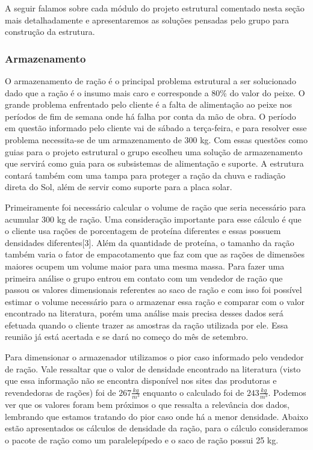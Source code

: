 A seguir falamos sobre cada módulo do projeto estrutural comentado nesta seção mais detalhadamente e apresentaremos as soluções pensadas pelo grupo para construção da estrutura.

\subsubsection{Armazenamento}

O armazenamento de ração é o principal problema estrutural a ser solucionado dado que a ração é o insumo mais caro e corresponde a 80\% do valor do peixe. O grande problema enfrentado pelo cliente é a falta de alimentação ao peixe nos períodos de fim de semana onde há falha por conta da mão de obra. O período em questão informado pelo cliente vai de sábado a terça-feira, e para resolver esse problema necessita-se de um armazenamento de 300 kg. Com essas questões como guias para o projeto estrutural o grupo escolheu uma solução de armazenamento que servirá como guia para os subsistemas de alimentação e suporte. A estrutura contará também com uma tampa para proteger a ração da chuva e radiação direta do Sol, além de servir como suporte para a placa solar.

Primeiramente foi necessário calcular o volume de ração que seria necessário para acumular 300 kg de ração. Uma consideração importante para esse cálculo é que o cliente usa rações de porcentagem de proteína diferentes e essas possuem densidades diferentes[3]. Além da quantidade de proteína, o tamanho da ração também varia o fator de empacotamento que faz com que as rações de dimensões maiores ocupem um volume maior para uma mesma massa. Para fazer uma primeira análise o grupo entrou em contato com um vendedor de ração que passou os valores dimensionais referentes ao saco de ração e com isso foi possível estimar o volume necessário para o armazenar essa ração e comparar com o valor encontrado na literatura, porém uma análise mais precisa desses dados será efetuada quando o cliente trazer as amostras da ração utilizada por ele. Essa reunião já está acertada e se dará no começo do mês de setembro.


Para dimensionar o armazenador utilizamos o pior caso informado pelo vendedor de ração. Vale ressaltar que o valor de densidade encontrado na literatura \cite{Omicsonline} (visto que essa informação não se encontra disponível nos sites das produtoras e revendedoras de rações) foi de $267 \frac{kg}{m^3}$ enquanto o calculado foi de $243 \frac{kg}{m^3}$. Podemos ver que os valores foram bem próximos o que ressalta a relevância dos dados, lembrando que estamos tratando do pior caso onde há a menor densidade. Abaixo estão apresentados os cálculos de densidade da ração, para o cálculo consideramos o pacote de ração como um paralelepípedo e o saco de ração possui 25 kg.

